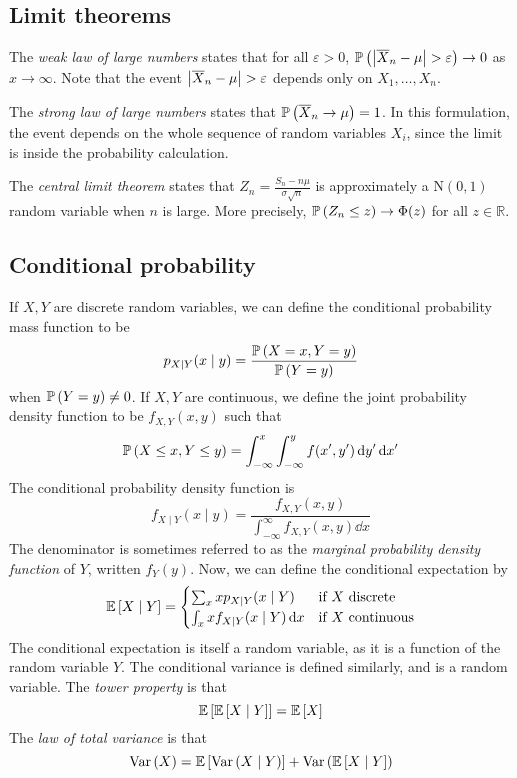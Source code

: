 \subsection{Limit theorems}
The \textit{weak law of large numbers} states that for all \( \varepsilon > 0 \), \( \mathbb{P}\left({\abs{\overline X_n - \mu} > \varepsilon}\right) \to 0 \) as \( x \to \infty \).
Note that the event \( \abs{\overline X_n - \mu} > \varepsilon \) depends only on \( X_1, \dots, X_n \).

The \textit{strong law of large numbers} states that \( \mathbb{P}\left({\overline X_n \to \mu}\right) = 1 \).
In this formulation, the event depends on the whole sequence of random variables \( X_i \), since the limit is inside the probability calculation.

The \textit{central limit theorem} states that \( Z_n = \frac{S_n - n \mu}{\sigma\sqrt{n}} \) is approximately a \( \mathrm{N}(0,1) \) random variable when \( n \) is large.
More precisely, \( \mathbb{P}\left({Z_n \leq z}\right) \to \Phi(z) \) for all \( z \in \mathbb R \).

\subsection{Conditional probability}
If \( X, Y \) are discrete random variables, we can define the conditional probability mass function to be
\[
	p_{X \mid Y}(x \mid y) = \frac{\mathbb{P}\left({X = x, Y = y}\right)}{\mathbb{P}\left({Y = y}\right)}
\]
when \( \mathbb{P}\left({Y = y}\right) \neq 0 \).
If \( X, Y \) are continuous, we define the joint probability density function to be \( f_{X, Y}(x,y) \) such that
\[
	\mathbb{P}\left({X \leq x, Y \leq y}\right) = \int_{-\infty}^x \int_{-\infty}^y f(x',y') \dd{y'}\dd{x'}
\]
The conditional probability density function is
\[
	f_{X \mid Y}(x \mid y) = \frac{f_{X, Y}(x,y)}{\int_{-\infty}^\infty f_{X,Y}(x,y) \dd{x}}
\]
The denominator is sometimes referred to as the \textit{marginal probability density function} of \( Y \), written \( f_Y(y) \).
Now, we can define the conditional expectation by
\[
	\mathbb{E}\left[{X \mid Y}\right] = \begin{cases}
		\sum_x x p_{X \mid Y}(x \mid Y)        & \text{if } X \text{ discrete}   \\
		\int_x x f_{X \mid Y}(x \mid Y) \dd{x} & \text{if } X \text{ continuous}
	\end{cases}
\]
The conditional expectation is itself a random variable, as it is a function of the random variable \( Y \).
The conditional variance is defined similarly, and is a random variable.
The \textit{tower property} is that
\[
	\mathbb{E}\left[{\mathbb{E}\left[{X \mid Y}\right]}\right] = \mathbb{E}\left[{X}\right]
\]
The \textit{law of total variance} is that
\[
	\operatorname{Var}\left({X}\right) = \mathbb{E}\left[{\operatorname{Var}\left({X \mid Y}\right)}\right] + \operatorname{Var}\left({\mathbb{E}\left[{X \mid Y}\right]}\right)
\]

